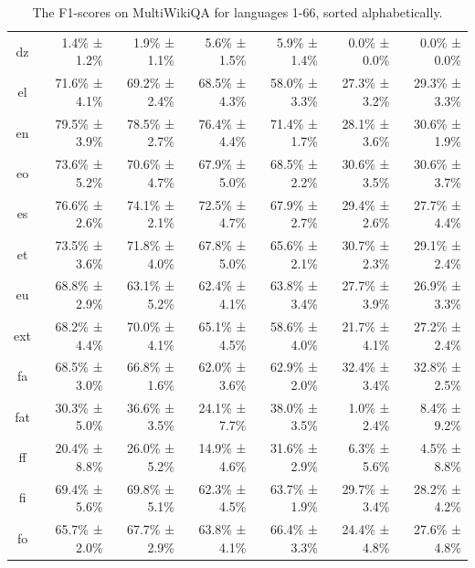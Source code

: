 \documentclass[10pt, a4paper]{article}
\begin{document}
\begin{table}[h]
\begin{tabular}{crrrrrr}
dz & 1.4\% ± 1.2\% & 1.9\% ± 1.1\% & 5.6\% ± 1.5\% & 5.9\% ± 1.4\% & 0.0\% ± 0.0\% & 0.0\% ± 0.0\% \\
el & 71.6\% ± 4.1\% & 69.2\% ± 2.4\% & 68.5\% ± 4.3\% & 58.0\% ± 3.3\% & 27.3\% ± 3.2\% & 29.3\% ± 3.3\% \\
en & 79.5\% ± 3.9\% & 78.5\% ± 2.7\% & 76.4\% ± 4.4\% & 71.4\% ± 1.7\% & 28.1\% ± 3.6\% & 30.6\% ± 1.9\% \\
eo & 73.6\% ± 5.2\% & 70.6\% ± 4.7\% & 67.9\% ± 5.0\% & 68.5\% ± 2.2\% & 30.6\% ± 3.5\% & 30.6\% ± 3.7\% \\
es & 76.6\% ± 2.6\% & 74.1\% ± 2.1\% & 72.5\% ± 4.7\% & 67.9\% ± 2.7\% & 29.4\% ± 2.6\% & 27.7\% ± 4.4\% \\
et & 73.5\% ± 3.6\% & 71.8\% ± 4.0\% & 67.8\% ± 5.0\% & 65.6\% ± 2.1\% & 30.7\% ± 2.3\% & 29.1\% ± 2.4\% \\
eu & 68.8\% ± 2.9\% & 63.1\% ± 5.2\% & 62.4\% ± 4.1\% & 63.8\% ± 3.4\% & 27.7\% ± 3.9\% & 26.9\% ± 3.3\% \\
ext & 68.2\% ± 4.4\% & 70.0\% ± 4.1\% & 65.1\% ± 4.5\% & 58.6\% ± 4.0\% & 21.7\% ± 4.1\% & 27.2\% ± 2.4\% \\
fa & 68.5\% ± 3.0\% & 66.8\% ± 1.6\% & 62.0\% ± 3.6\% & 62.9\% ± 2.0\% & 32.4\% ± 3.4\% & 32.8\% ± 2.5\% \\
fat & 30.3\% ± 5.0\% & 36.6\% ± 3.5\% & 24.1\% ± 7.7\% & 38.0\% ± 3.5\% & 1.0\% ± 2.4\% & 8.4\% ± 9.2\% \\
ff & 20.4\% ± 8.8\% & 26.0\% ± 5.2\% & 14.9\% ± 4.6\% & 31.6\% ± 2.9\% & 6.3\% ± 5.6\% & 4.5\% ± 8.8\% \\
fi & 69.4\% ± 5.6\% & 69.8\% ± 5.1\% & 62.3\% ± 4.5\% & 63.7\% ± 1.9\% & 29.7\% ± 3.4\% & 28.2\% ± 4.2\% \\
fo & 65.7\% ± 2.0\% & 67.7\% ± 2.9\% & 63.8\% ± 4.1\% & 66.4\% ± 3.3\% & 24.4\% ± 4.8\% & 27.6\% ± 4.8\% \\
\bottomrule
\end{tabular}
\caption{The F1-scores on MultiWikiQA for languages 1-66, sorted alphabetically.}
\label{tab:num-samples-in-small-subsets}
\end{table}
\end{document}

